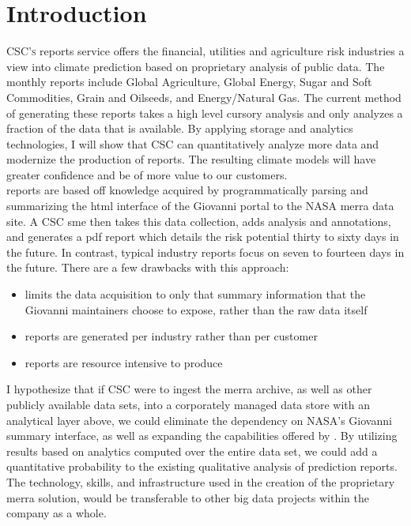 
\chapter{Introduction}
\textsc{CSC's} \climatedge reports service offers the financial, utilities and agriculture risk industries a view into climate prediction based on proprietary analysis of public data. The monthly reports include Global Agriculture, Global Energy, Sugar and Soft Commodities, Grain and Oilseeds, and Energy/Natural Gas\cite{climatedgeurl}. The current method of generating these reports takes a high level cursory analysis and only analyzes a fraction of the data that is available. By applying  storage and analytics technologies, I will show that \textsc{CSC} can quantitatively analyze more data and modernize the production of \climatedge reports. The resulting climate models will have greater confidence and be of more value to our customers.\\

\climatedge reports are based off knowledge acquired by programmatically parsing and summarizing the \gls{html} interface of the Giovanni\cite{giovanni} portal to the NASA \gls{merra} data site.  A \textsc{CSC} \gls{sme} then takes this data collection, adds analysis and annotations, and generates a \gls{pdf} report which details the risk potential thirty to sixty days in the future. In contrast, typical industry reports focus on seven to fourteen days in the future. There are a few drawbacks with this approach:
\begin{itemize}
    \item{limits the data acquisition to only that summary information that the Giovanni  maintainers choose to expose, rather than the raw data itself}
    \item{reports are generated per industry rather than per customer}
    \item{reports are resource intensive to produce}
\end{itemize}
I hypothesize that if \textsc{CSC} were to ingest the \gls{merra} archive, as well as other publicly available data sets, into a corporately managed data store with an analytical layer above, we could eliminate the dependency on NASA's Giovanni summary interface, as well as expanding the capabilities offered by \climatedge. By utilizing results based on analytics computed over the entire data set, we could add a quantitative probability to the existing qualitative analysis of \climatedge prediction reports. The technology, skills, and infrastructure used in the creation of the proprietary \gls{merra} solution, would be transferable to other big data projects within the company as a whole.\\

